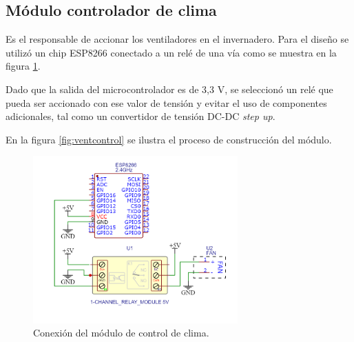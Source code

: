 \subsection{Módulo controlador de clima}
\label{Hardware módulo controlador de clima}

Es el responsable de accionar los ventiladores en el invernadero. Para el diseño se utilizó un chip ESP8266 conectado a un relé de una vía como se muestra en la figura \ref{fig:ventschem}. 

Dado que la salida del microcontrolador es de 3,3 V, se seleccionó un relé que pueda ser accionado con ese valor de tensión y evitar el uso de componentes adicionales, tal como un convertidor de tensión DC-DC \textit{step up}. 

En la figura \ref{fig:ventcontrol} se ilustra el proceso de construcción del módulo. 



\begin{figure}[!h]
	\centering
	\includegraphics[width=0.7\textwidth]{./Figures/vent_schem.png}
	\caption[Conexión del módulo de control de clima]{Conexión del módulo de control de clima.}
	\label{fig:ventschem}
\end{figure}



